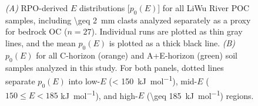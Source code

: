 \begin{figure}[p]
	\label{Ch6Fig:S2} 
\end{figure}

\begin{figure}[p]
	\caption[RPO $p_{0}(E)$ distributions for all samples analyzed]{\textit{(A)} RPO-derived $E$ distributions [$p_{0}(E)$] for all LiWu River POC samples, including \SI{\geq 2}{mm} clasts analyzed separately as a proxy for bedrock OC ($n = 27$). Individual runs are plotted as thin gray lines, and the mean $p_{0}(E)$ is plotted as a thick black line. \textit{(B)} $p_{0}(E)$ for all C-horizon (orange) and A+E-horizon (green) soil samples analyzed in this study. For both panels, dotted lines separate $p_{0}(E)$ into low-$E$ (\SI{< 150}{kJ.mol^{-1}}), mid-$E$ ($150 \leq E < 185$ \si{kJ.mol^{-1}}), and high-$E$ (\SI{\geq 185}{kJ.mol^{-1}}) regions.}
	\label{Ch6Fig:S3} 
\end{figure}

\renewcommand\thefigure{\thechapter.\arabic{figure}}
